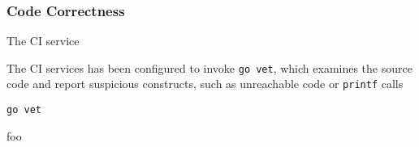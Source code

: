 
\subsubsection{Code Correctness}

The CI service





























The CI services has been configured to invoke \texttt{go vet}, which examines the source code and report suspicious constructs, such as unreachable code or \texttt{printf} calls

\texttt{go vet}

foo
